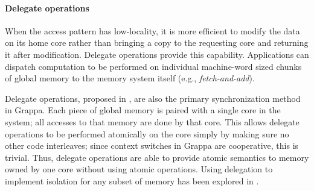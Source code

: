 \paragraph{Delegate operations}
When the access pattern has low-locality, it is more efficient
to modify the data on its home core rather than bringing a copy to the
requesting core and returning it after modification. Delegate
operations provide this capability. Applications can dispatch
computation to be performed on individual machine-word sized chunks of
global memory to the memory system itself (e.g.,
\emph{fetch-and-add}). 

Delegate operations, proposed in \cite{Nelson:hotpar11}, are also the primary synchronization method in
Grappa. Each piece of global memory is paired with a single core in
the system; all accesses to that memory are done by that core. This
allows delegate operations to be performed atomically on the core
simply by making sure no other code interleaves; since context
switches in Grappa are cooperative, this is trivial. Thus, delegate
operations are able to provide atomic semantics to memory owned by one core without using atomic
operations. Using delegation to implement isolation for any subset of
memory has been explored in \cite{delegated:oopsla11}.

